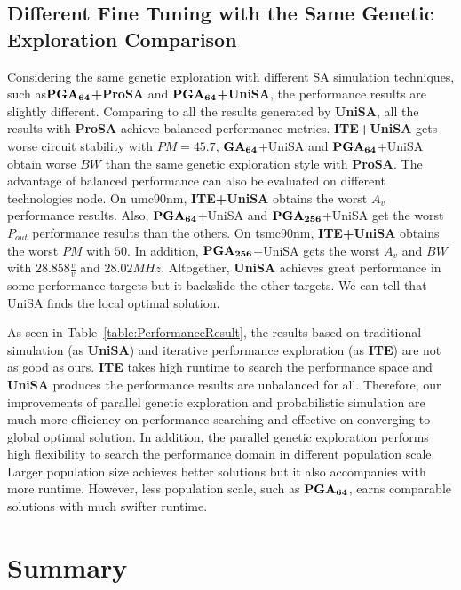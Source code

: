     \subsection{Different Fine Tuning with the Same Genetic Exploration Comparison}\label{sec:ExPSGEFT}

      Considering the same genetic exploration with different SA simulation techniques, such as{$\bf PGA_{64}$\bf+ProSA} and {$\bf PGA_{64}$\bf+UniSA}, the performance results are slightly different. Comparing to all the results generated by {\bf UniSA}, all the results with {\bf ProSA} achieve balanced performance metrics. {\bf ITE+UniSA} gets worse circuit stability with $PM=45.7$\textdegree, {$\bf GA_{64}$+UniSA} and {$\bf PGA_{64}$+UniSA} obtain worse $BW$ than the same genetic exploration style with {\bf ProSA}. The advantage of balanced performance can also be evaluated on different technologies node. On umc90nm, {\bf ITE+UniSA} obtains the worst $A_v$ performance results. Also, {$\bf PGA_{64}$+UniSA} and {$\bf PGA_{256}$+UniSA} get the worst $P_{out}$ performance results than the others. On tsmc90nm, {\bf ITE+UniSA} obtains the worst $PM$ with $50$\textdegree. In addition, {$\bf PGA_{256}$+UniSA} gets the worst $A_v$ and $BW$ with $28.858\frac{v}{v}$ and $28.02MHz$. Altogether, {\bf UniSA} achieves great performance in some performance targets but it backslide the other targets. We can tell that UniSA finds the local optimal solution.
    
      As seen in Table~\ref{table:PerformanceResult}, the results based on traditional simulation (as {\bf UniSA}) and iterative performance exploration (as {\bf ITE}) are not as good as ours. {\bf ITE} takes high runtime to search the performance space and {\bf UniSA} produces the performance results are unbalanced for all. Therefore, our improvements of parallel genetic exploration and probabilistic simulation are much more efficiency on performance searching and effective on converging to global optimal solution. In addition, the parallel genetic exploration performs high flexibility to search the performance domain in different population scale. Larger population size achieves better solutions but it also accompanies with more runtime. However, less population scale, such as {$\bf PGA_{64}$}, earns comparable solutions with much swifter runtime.
  
  \section{Summary}\label{sec:PAGESum}

